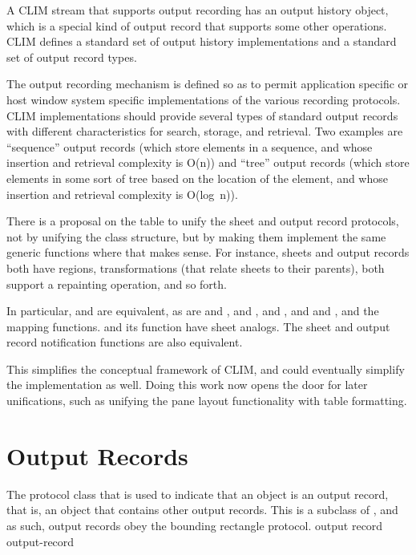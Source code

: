 A CLIM stream that supports output recording has an output history object, which
is a special kind of output record that supports some other operations.  CLIM
defines a standard set of output history implementations and a standard set of
output record types.

The output recording mechanism is defined so as to permit application specific
or host window system specific implementations of the various recording
protocols.  CLIM implementations should provide several types of standard output
records with different characteristics for search, storage, and retrieval.  Two
examples are ``sequence'' output records (which store elements in a sequence,
and whose insertion and retrieval complexity is O(n)) and ``tree'' output
records (which store elements in some sort of tree based on the location of the
element, and whose insertion and retrieval complexity is O(log~n)).

 {There is a proposal on the table to unify the sheet and
output record protocols, not by unifying the class structure, but by making them
implement the same generic functions where that makes sense.  For instance,
sheets and output records both have regions, transformations (that relate sheets
to their parents), both support a repainting operation, and so forth.

In particular,  and  are equivalent,
as are  and ,
 and ,  and
, and  and ,
and the mapping functions.   and its 
function have sheet analogs.  The sheet and output record notification functions
are also equivalent.

This simplifies the conceptual framework of CLIM, and could eventually simplify
the implementation as well.  Doing this work now opens the door for later
unifications, such as unifying the pane layout functionality with table formatting.}


\section {Output Records}


The protocol class that is used to indicate that an object is an output record,
that is, an object that contains other output records.  This is a subclass of
, and as such, output records obey the bounding rectangle
protocol.
 {output record} {output-record}

